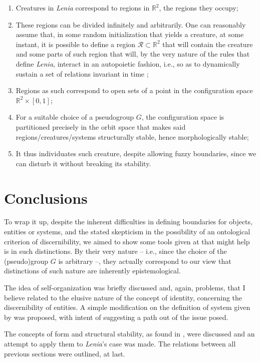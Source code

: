 \documentclass[12pt, a4paper]{article} %
\theoremstyle{definition}
\begin{document}
	\begin{enumerate}
		\item Creatures in \textit{Lenia} correspond to regions in $\mathbb{R}^2$, the regions they occupy;
		\item These regions can be divided infinitely and arbitrarily. One can reasonably assume that, in some random initialization that yields a creature, at some instant, it is possible to define a region $\mathcal{R} \subset \mathbb{R}^2$ that will contain the creature and some parts of such region that will, by the very nature of the rules that define \textit{Lenia}, interact in an autopoietic fashion, i.e., so as to dynamically sustain a set of relations invariant in time \cite{Maturana1980};
		\item Regions as such correspond to open sets of a point in the configuration space $\mathbb{R}^2 \times [0, 1]$;
		\item For a suitable choice of a pseudogroup $G$, the configuration space is partitioned precisely in the orbit space that makes said regions/creatures/systems structurally stable, hence morphologically stable;
		\item It thus individuates such creature, despite allowing fuzzy boundaries, since we can disturb it without breaking its stability.
	\end{enumerate}
	
	\section{Conclusions}
	
	To wrap it up, despite the inherent difficulties in defining boundaries for objects, entities or systems, and the stated skepticism in the possibility of an ontological criterion of discernibility, we aimed to show some tools given at \citet{Thom1982} that might help is in such distinctions. By their very nature -- i.e., since the choice of the (pseudo)group $G$ is arbitrary --, they actually correspond to our view that distinctions of such nature are inherently epistemological.
	
	The idea of self-organization was briefly discussed and, again, problems, that I believe related to the elusive nature of the concept of identity, concerning the discernibility of entities. A simple modification on the definition of system given by \citet{Mesarovic1989} was proposed, with intent of suggesting a path out of the issue posed.
	
	The concepts of form and structural stability, as found in \citet{Thom1982}, were discussed and an attempt to apply them to \textit{Lenia}'s case was made. The relations between all previous sections were outlined, at last.
	
\end{document}
